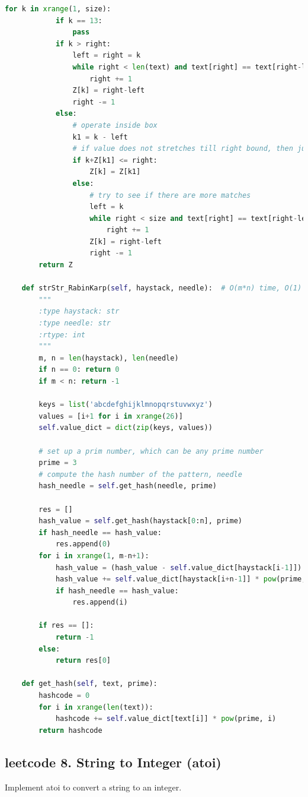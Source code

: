 \documentclass[a4paper,10pt]{article}
\begin{document}
\begin{lstlisting}[language=Python, caption=Problem28. Implement strStr()]
        for k in xrange(1, size):
            if k == 13:
                pass
            if k > right:
                left = right = k
                while right < len(text) and text[right] == text[right-left]:
                    right += 1
                Z[k] = right-left
                right -= 1
            else:
                # operate inside box
                k1 = k - left
                # if value does not stretches till right bound, then just copy it
                if k+Z[k1] <= right:
                    Z[k] = Z[k1]
                else:
                    # try to see if there are more matches
                    left = k
                    while right < size and text[right] == text[right-left]:
                        right += 1
                    Z[k] = right-left
                    right -= 1
        return Z
    
    def strStr_RabinKarp(self, haystack, needle):  # O(m*n) time, O(1) space
        """
        :type haystack: str
        :type needle: str
        :rtype: int
        """
        m, n = len(haystack), len(needle)
        if n == 0: return 0
        if m < n: return -1

        keys = list('abcdefghijklmnopqrstuvwxyz')
        values = [i+1 for i in xrange(26)]
        self.value_dict = dict(zip(keys, values))

        # set up a prim number, which can be any prime number
        prime = 3
        # compute the hash number of the pattern, needle
        hash_needle = self.get_hash(needle, prime)

        res = []
        hash_value = self.get_hash(haystack[0:n], prime)
        if hash_needle == hash_value:
            res.append(0)
        for i in xrange(1, m-n+1):
            hash_value = (hash_value - self.value_dict[haystack[i-1]]) / prime
            hash_value += self.value_dict[haystack[i+n-1]] * pow(prime, (n-1))
            if hash_needle == hash_value:
                res.append(i)

        if res == []:
            return -1
        else:
            return res[0]

    def get_hash(self, text, prime):
        hashcode = 0
        for i in xrange(len(text)):
            hashcode += self.value_dict[text[i]] * pow(prime, i)
        return hashcode
\end{lstlisting}



\subsection{leetcode 8. String to Integer (atoi)}
Implement atoi to convert a string to an integer.\\
\end{document}
